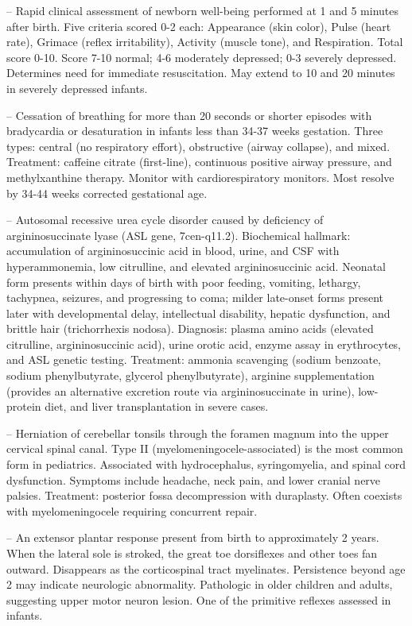 -- Rapid clinical assessment of newborn well-being performed at 1 and 5 minutes after birth. Five criteria scored 0-2 each: Appearance (skin color), Pulse (heart rate), Grimace (reflex irritability), Activity (muscle tone), and Respiration. Total score 0-10. Score 7-10 normal; 4-6 moderately depressed; 0-3 severely depressed. Determines need for immediate resuscitation. May extend to 10 and 20 minutes in severely depressed infants.

-- Cessation of breathing for more than 20 seconds or shorter episodes with bradycardia or desaturation in infants less than 34-37 weeks gestation. Three types: central (no respiratory effort), obstructive (airway collapse), and mixed. Treatment: caffeine citrate (first-line), continuous positive airway pressure, and methylxanthine therapy. Monitor with cardiorespiratory monitors. Most resolve by 34-44 weeks corrected gestational age.

-- Autosomal recessive urea cycle disorder caused by deficiency of argininosuccinate lyase (ASL gene, 7cen-q11.2). Biochemical hallmark: accumulation of argininosuccinic acid in blood, urine, and CSF with hyperammonemia, low citrulline, and elevated argininosuccinic acid. Neonatal form presents within days of birth with poor feeding, vomiting, lethargy, tachypnea, seizures, and progressing to coma; milder late-onset forms present later with developmental delay, intellectual disability, hepatic dysfunction, and brittle hair (trichorrhexis nodosa). Diagnosis: plasma amino acids (elevated citrulline, argininosuccinic acid), urine orotic acid, enzyme assay in erythrocytes, and ASL genetic testing. Treatment: ammonia scavenging (sodium benzoate, sodium phenylbutyrate, glycerol phenylbutyrate), arginine supplementation (provides an alternative excretion route via argininosuccinate in urine), low-protein diet, and liver transplantation in severe cases.

-- Herniation of cerebellar tonsils through the foramen magnum into the upper cervical spinal canal. Type II (myelomeningocele-associated) is the most common form in pediatrics. Associated with hydrocephalus, syringomyelia, and spinal cord dysfunction. Symptoms include headache, neck pain, and lower cranial nerve palsies. Treatment: posterior fossa decompression with duraplasty. Often coexists with myelomeningocele requiring concurrent repair.

-- An extensor plantar response present from birth to approximately 2 years. When the lateral sole is stroked, the great toe dorsiflexes and other toes fan outward. Disappears as the corticospinal tract myelinates. Persistence beyond age 2 may indicate neurologic abnormality. Pathologic in older children and adults, suggesting upper motor neuron lesion. One of the primitive reflexes assessed in infants.

